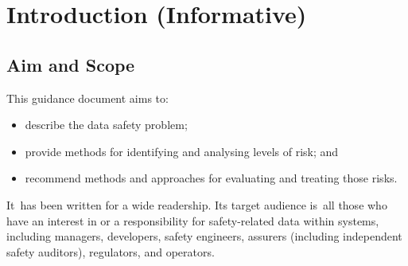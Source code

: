 %
%

%
%
\setcounter{page}{1}
\pagestyle{Standard} %
\thispagestyle{FirstPage}

\section{Introduction (Informative)} \label{bkm:introduction}


\subsection{Aim and Scope}
This guidance document aims to:
\begin{itemize}
	\item describe the data safety problem;
	\item provide methods for identifying and analysing levels of risk; and
	\item recommend methods and approaches for evaluating and treating those risks.
\end{itemize}

\cbstart It\cbend\ has been written for a wide readership. Its target audience \cbstart is\cbend\ all those who have an interest in or a responsibility for safety-related data within systems, including managers, developers, safety engineers, assurers (including independent safety auditors), regulators, and operators. 

